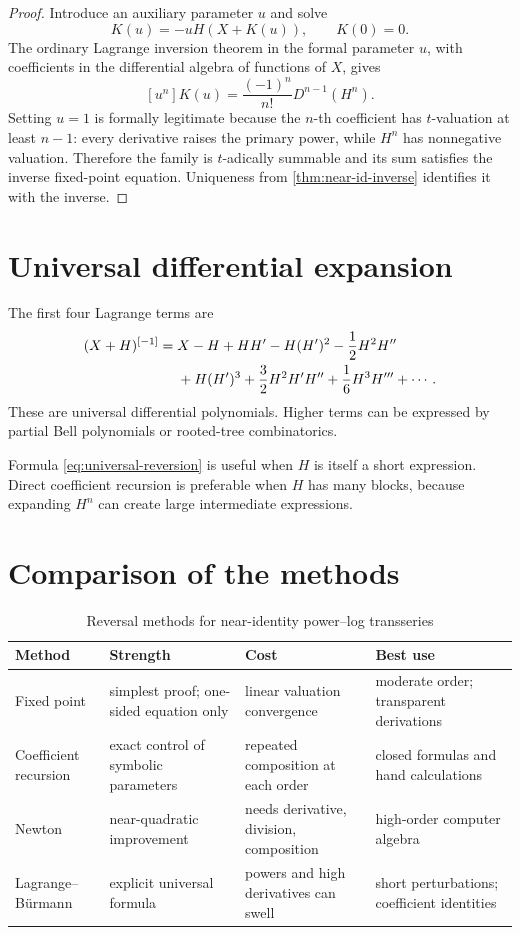 \documentclass[11pt,openany]{book}
\theoremstyle{definition}
\theoremstyle{plain}
\theoremstyle{remark}
\newcommand{\invcomp}{^{[-1]}}
\begin{document}
\begin{proof}
Introduce an auxiliary parameter \(u\) and solve
\[
 K(u)=-uH(X+K(u)),\qquad K(0)=0.
\]
The ordinary Lagrange inversion theorem in the formal parameter \(u\), with coefficients in the differential algebra of functions of \(X\), gives
\[
 [u^n]K(u)=\frac{(-1)^n}{n!}D^{n-1}(H^n).
\]
Setting \(u=1\) is formally legitimate because the \(n\)-th coefficient has \(t\)-valuation at least \(n-1\): every derivative raises the primary power, while \(H^n\) has nonnegative valuation. Therefore the family is \(t\)-adically summable and its sum satisfies the inverse fixed-point equation. Uniqueness from \cref{thm:near-id-inverse} identifies it with the inverse.
\end{proof}

\section{Universal differential expansion}
The first four Lagrange terms are
\begin{align}
 (X+H)\invcomp={}&X-H+HH'
 -H(H')^2-\frac12H^2H''\notag\\
 &+H(H')^3+\frac32H^2H'H''+\frac16H^3H'''
 +\cdots.
\label{eq:universal-reversion}
\end{align}
These are universal differential polynomials. Higher terms can be expressed by partial Bell polynomials or rooted-tree combinatorics.

Formula \cref{eq:universal-reversion} is useful when \(H\) is itself a short expression. Direct coefficient recursion is preferable when \(H\) has many blocks, because expanding \(H^n\) can create large intermediate expressions.

\section{Comparison of the methods}
\begin{table}[htbp]
\centering
\caption{Reversal methods for near-identity power--log transseries}\label{tab:reversal-methods}
\small
\begin{tabularx}{\textwidth}{@{}p{}XXX@{}}
\toprule
Method & Strength & Cost & Best use\\
\midrule
Fixed point & simplest proof; one-sided equation only & linear valuation convergence & moderate order; transparent derivations\\
Coefficient recursion & exact control of symbolic parameters & repeated composition at each order & closed formulas and hand calculations\\
Newton & near-quadratic improvement & needs derivative, division, composition & high-order computer algebra\\
Lagrange--B\"urmann & explicit universal formula & powers and high derivatives can swell & short perturbations; coefficient identities\\
\bottomrule
\end{tabularx}
\end{table}
\end{document}

